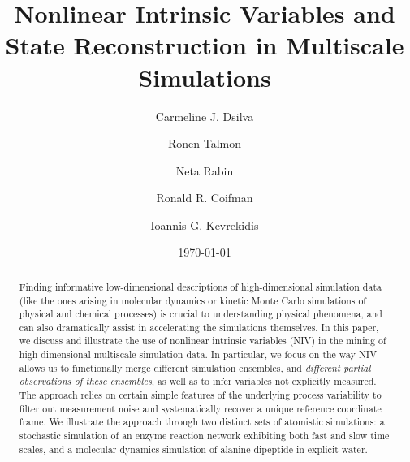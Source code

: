 \documentclass[aip,jcp,preprint]{revtex4-1}
\begin{document}
\title{Nonlinear Intrinsic Variables and State Reconstruction in Multiscale Simulations}

\author{Carmeline J. Dsilva}

\author{Ronen Talmon}

\author{Neta Rabin}

\author{Ronald R. Coifman}

\author{Ioannis G. Kevrekidis}

\date{\today}

\begin{abstract}
Finding informative low-dimensional descriptions of high-dimensional simulation data
(like the ones arising in molecular dynamics or kinetic Monte Carlo simulations of
physical and chemical processes) is crucial to understanding physical phenomena, and can
also dramatically assist in accelerating the simulations themselves.
%
In this paper, we discuss and illustrate the use of nonlinear intrinsic variables (NIV)
in the mining of high-dimensional multiscale simulation data.
%
In particular, we focus on the way NIV allows us to functionally merge different
simulation ensembles, and {\em different partial observations of these ensembles}, as well
as to infer variables not explicitly measured.
%
The approach relies on certain simple features of the underlying process variability to
filter out measurement noise and systematically recover a unique reference coordinate frame.
%
We illustrate the approach through two distinct sets of atomistic simulations:
a stochastic simulation of an enzyme reaction network exhibiting both fast and slow time scales,
 and a molecular dynamics simulation of alanine dipeptide in explicit water.

\end{abstract}
\end{document}
